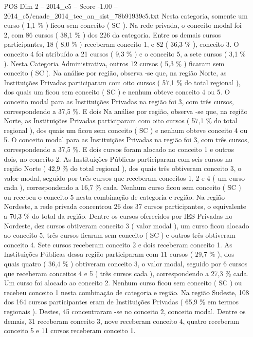 \begin{textsample}{POS Dim 2 – 2014\_c5 – Score -1.00 – 2014\_c5/enade\_2014\_tec\_an\_sist\_78b91939e5.txt}
Nesta categoria, somente um curso ( 1,1 \% ) ficou sem conceito ( SC ).
Na rede privada, o conceito modal foi 2, com 86 cursos ( 38,1 \% ) dos 226 da categoria.
Entre os demais cursos participantes, 18 ( 8,0 \% ) receberam conceito 1, e 82 ( 36,3 \% ), conceito 3.
O conceito 4 foi atribuído a 21 cursos ( 9,3 \% ) e o conceito 5, a sete cursos ( 3,1 \% ).
Nesta Categoria Administrativa, outros 12 cursos ( 5,3 \% ) ficaram sem conceito ( SC ).
Na análise por região, observa -se que, na região Norte, as Instituições Privadas participaram com oito cursos ( 57,1 \% do total regional ), dos quais um ficou sem conceito ( SC ) e nenhum obteve conceito 4 ou 5.
O conceito modal para as Instituições Privadas na região foi 3, com três cursos, correspondendo a 37,5 \%.
E dois Na análise por região, observa -se que, na região Norte, as Instituições Privadas participaram com oito cursos ( 57,1 \% do total regional ), dos quais um ficou sem conceito ( SC ) e nenhum obteve conceito 4 ou 5.
O conceito modal para as Instituições Privadas na região foi 3, com três cursos, correspondendo a 37,5 \%.
E dois cursos foram alocado no conceito 1 e outros dois, no conceito 2.
As Instituições Públicas participaram com seis cursos na região Norte ( 42,9 \% do total regional ), dos quais três obtiveram conceito 3, o valor modal, seguido por três cursos que receberam conceitos 1, 2 e 4 ( um curso cada ), correspondendo a 16,7 \% cada.
Nenhum curso ficou sem conceito ( SC ) ou recebeu o conceito 5 nesta combinação de categoria e região.
Na região Nordeste, a rede privada concentrou 26 dos 37 cursos participantes, o equivalente a 70,3 \% do total da região.
Dentre os cursos oferecidos por IES Privadas no Nordeste, dez cursos obtiveram conceito 3 ( valor modal ), um curso ficou alocado ao conceito 5, três cursos ficaram sem conceito ( SC ) e outros três obtiveram conceito 4.
Sete cursos receberam conceito 2 e dois receberam conceito 1.
As Instituições Públicas dessa região participaram com 11 cursos ( 29,7 \% ), dos quais quatro ( 36,4 \% ) obtiveram conceito 3, o valor modal, seguido por 6 cursos que receberam conceitos 4 e 5 ( três cursos cada ), correspondendo a 27,3 \% cada.
Um curso foi alocado ao conceito 2.
Nenhum curso ficou sem conceito ( SC ) ou recebeu conceito 1 nesta combinação de categoria e região.
Na região Sudeste, 108 dos 164 cursos participantes eram de Instituições Privadas ( 65,9 \% em termos regionais ).
Destes, 45 concentraram -se no conceito 2, conceito modal.
Dentre os demais, 31 receberam conceito 3, nove receberam conceito 4, quatro receberam conceito 5 e 11 cursos receberam conceito 1.

\end{textsample}
